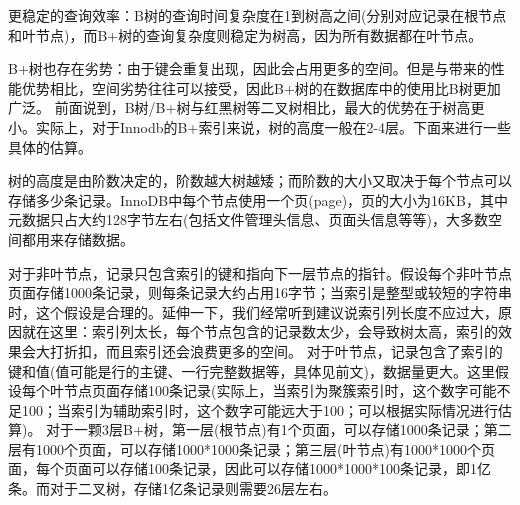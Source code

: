 \documentclass[../../../interview-questions.tex]{subfiles}
\begin{document}
更稳定的查询效率：B树的查询时间复杂度在1到树高之间(分别对应记录在根节点和叶节点)，而B+树的查询复杂度则稳定为树高，因为所有数据都在叶节点。

B+树也存在劣势：由于键会重复出现，因此会占用更多的空间。但是与带来的性能优势相比，空间劣势往往可以接受，因此B+树的在数据库中的使用比B树更加广泛。
前面说到，B树/B+树与红黑树等二叉树相比，最大的优势在于树高更小。实际上，对于Innodb的B+索引来说，树的高度一般在2-4层。下面来进行一些具体的估算。

树的高度是由阶数决定的，阶数越大树越矮；而阶数的大小又取决于每个节点可以存储多少条记录。InnoDB中每个节点使用一个页(page)，页的大小为16KB，其中元数据只占大约128字节左右(包括文件管理头信息、页面头信息等等)，大多数空间都用来存储数据。

对于非叶节点，记录只包含索引的键和指向下一层节点的指针。假设每个非叶节点页面存储1000条记录，则每条记录大约占用16字节；当索引是整型或较短的字符串时，这个假设是合理的。延伸一下，我们经常听到建议说索引列长度不应过大，原因就在这里：索引列太长，每个节点包含的记录数太少，会导致树太高，索引的效果会大打折扣，而且索引还会浪费更多的空间。
对于叶节点，记录包含了索引的键和值(值可能是行的主键、一行完整数据等，具体见前文)，数据量更大。这里假设每个叶节点页面存储100条记录(实际上，当索引为聚簇索引时，这个数字可能不足100；当索引为辅助索引时，这个数字可能远大于100；可以根据实际情况进行估算)。
对于一颗3层B+树，第一层(根节点)有1个页面，可以存储1000条记录；第二层有1000个页面，可以存储1000*1000条记录；第三层(叶节点)有1000*1000个页面，每个页面可以存储100条记录，因此可以存储1000*1000*100条记录，即1亿条。而对于二叉树，存储1亿条记录则需要26层左右。
\end{document}
